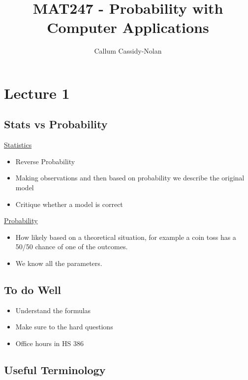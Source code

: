 \documentclass[11pt]{book}
\title{MAT247 - Probability with Computer Applications}
\author{Callum Cassidy-Nolan}
\begin{document}


\chapter{Lecture 1}%
\label{chp:lecture_1}

\section{Stats vs Probability}%
\label{sec:stats_vs_probability}

\underline{Statistics} 
\begin{itemize}
    \item Reverse Probability
    \item Making observations and then based on probability we describe the original model
    \item Critique whether a model is correct 
\end{itemize}
\underline{Probability} 
\begin{itemize}
    \item How likely based on a theoretical situation, for example a coin toss has a 50/50 chance of one of the outcomes.
    \item We know all the parameters.
\end{itemize}


\section{To do Well}%
\label{sec:to_do_well}

\begin{itemize}
    \item Understand the formulas
    \item Make sure to the hard questions
    \item Office hours in HS 386
\end{itemize}


\newpage

\section{Useful Terminology}%
\label{sec:useful_terminology}
\end{document}
